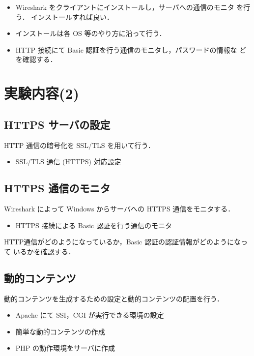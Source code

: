  \begin{itemize}
 \item Wireshark をクライアントにインストールし，サーバへの通信のモニタ
       を行う．
       インストールすれば良い．
 \item インストールは各 OS 等のやり方に沿って行う．
 \item HTTP 接続にて Basic 認証を行う通信のモニタし，パスワードの情報な
       どを確認する．
 \end{itemize}


\section{実験内容(2)}

\subsection{HTTPS サーバの設定}

HTTP 通信の暗号化を SSL/TLS を用いて行う．

\begin{itemize}
\item SSL/TLS 通信 (HTTPS) 対応設定
\end{itemize}

\subsection{HTTPS 通信のモニタ}

Wireshark によって Windows からサーバへの HTTPS 通信をモニタする．
\begin{itemize}
 \item HTTPS 接続による Basic 認証を行う通信のモニタ
\end{itemize}

HTTP通信がどのようになっているか，Basic 認証の認証情報がどのようになって
いるかを確認する．

\subsection{動的コンテンツ}

動的コンテンツを生成するための設定と動的コンテンツの配置を行う．
\begin{itemize}
\item Apache にて SSI，CGI が実行できる環境の設定
\item 簡単な動的コンテンツの作成
\item PHP の動作環境をサーバに作成
\end{itemize}

